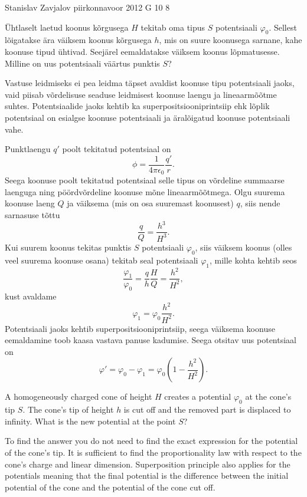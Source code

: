 {Stanislav Zavjalov} %
{piirkonnavoor} %
{2012} %
{G 10} %
{8} %
{
\ifStatement
Ühtlaselt laetud koonus kõrgusega $H$ tekitab oma tipus $S$ potentsiaali
$\varphi_0$. Sellest lõigatakse ära väiksem koonus kõrgusega $h$, mis on suure
koonusega sarnane, kahe koonuse tipud ühtivad. Seejärel eemaldatakse väiksem koonus
lõpmatusesse. Milline on uus potentsiaali väärtus punktis $S$?
\fi


\ifHint
Vastuse leidmiseks ei pea leidma täpset avaldist koonuse tipu potentsiaali jaoks, vaid piisab võrdelisuse seaduse leidmisest koonuse laengu ja lineaarmõõtme suhtes. Potentsiaalide jaoks kehtib ka superpositsiooniprintsiip ehk lõplik potentsiaal on esialgse koonuse potentsiaali ja äralõigatud koonuse potentsiaali vahe.
\fi


\ifSolution
Punktlaengu $q'$ poolt tekitatud potentsiaal on
\[
\phi = \frac{1}{4 \pi \epsilon_0} \frac{q'}{r}.
\]
Seega koonuse poolt tekitatud potentsiaal selle tipus on võrdeline summaarse laenguga ning pöördvõrdeline koonuse mõne lineaarmõõtmega. Olgu suurema koonuse laeng $Q$ ja väiksema (mis on osa suuremast koonusest) $q$, siis nende sarnasuse tõttu
\[
\frac{q}{Q} = \frac{h^3}{H^3}.
\]
Kui suurem koonus tekitas punktis $S$ potentsiaali $\varphi_0$, siis väiksem koonus (olles veel suurema koonuse osana) tekitab seal potentsiaali $\varphi_1$, mille kohta kehtib seos
\[
\frac{\varphi_1}{\varphi_0} = \frac{q}{h} \frac{H}{Q} = \frac{h^2}{H^2},
\]
kust avaldame
\[
\varphi_1 = \varphi_0 \frac{h^2}{H^2}.
\]
Potentsiaali jaoks kehtib superpositsiooniprintsiip, seega väiksema koonuse eemaldamine toob kaasa vastava panuse kadumise. Seega otsitav uus potentsiaal on
\[
\varphi' = \varphi_0 - \varphi_1 = \varphi_0 \left( 1 - \frac{h^2}{H^2}\right).
\]
\fi


\ifEngStatement
A homogeneously charged cone of height $H$ creates a potential $\varphi_0$ at the cone’s tip $S$. The cone’s tip of height $h$ is cut off and the removed part is displaced to infinity. What is the new potential at the point $S$?
\fi


\ifEngHint
To find the answer you do not need to find the exact expression for the potential of the cone's tip. It is sufficient to find the proportionality law with respect to the cone's charge and linear dimension. Superposition principle also applies for the potentials meaning that the final potential is the difference between the initial potential of the cone and the potential of the cone cut off.
\fi


}
